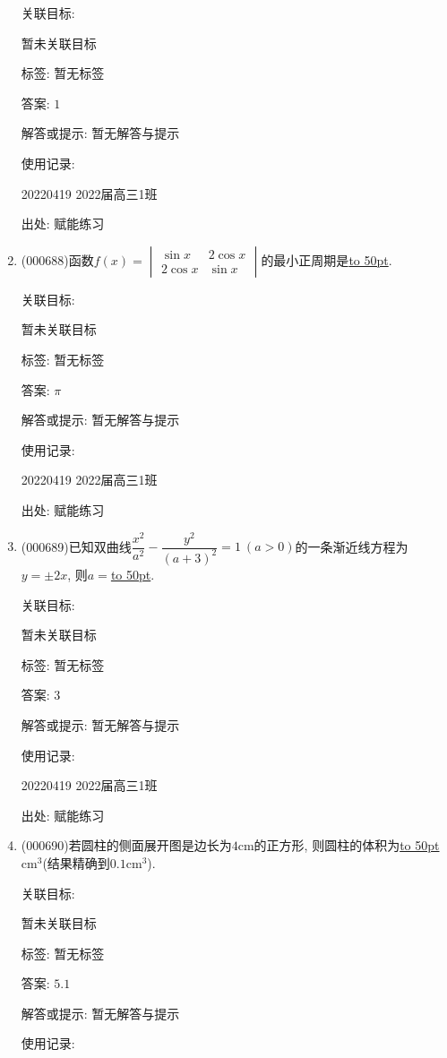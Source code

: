\documentclass[10pt,a4paper]{article}
\newcommand{\blank}[1]{\underline{\hbox to #1pt{}}}
\begin{document}
\begin{enumerate}[1.]
关联目标:

暂未关联目标



标签: 暂无标签

答案: $1$

解答或提示: 暂无解答与提示

使用记录:

20220419	2022届高三1班	


出处: 赋能练习
\item { (000688)}函数$f(x)=\begin{vmatrix} \sin x & 2\cos x \\ 2\cos x & \sin x\end{vmatrix}$的最小正周期是\blank{50}.


关联目标:

暂未关联目标



标签: 暂无标签

答案: $\pi$

解答或提示: 暂无解答与提示

使用记录:

20220419	2022届高三1班	


出处: 赋能练习
\item { (000689)}已知双曲线$\dfrac{x^2}{a^2}-\dfrac{y^2}{(a+3)^2}=1 \ (a>0)$的一条渐近线方程为$y=\pm 2x$, 则$a=$\blank{50}.


关联目标:

暂未关联目标



标签: 暂无标签

答案: $3$

解答或提示: 暂无解答与提示

使用记录:

20220419	2022届高三1班	


出处: 赋能练习
\item { (000690)}若圆柱的侧面展开图是边长为$4\text{cm}$的正方形, 则圆柱的体积为\blank{50}$\text{cm}^3$(结果精确到$0.1\text{cm}^3$).


关联目标:

暂未关联目标



标签: 暂无标签

答案: $5.1$

解答或提示: 暂无解答与提示

使用记录:


\end{enumerate}
\end{document}
